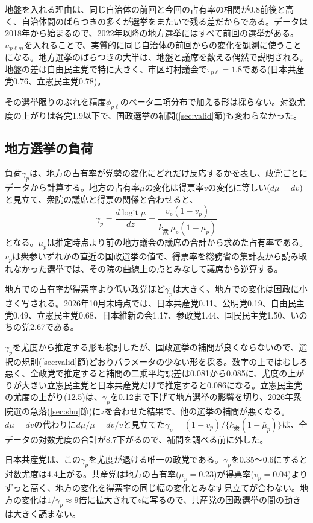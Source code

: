 \documentclass[a4paper,11pt]{ltjsarticle}
\begin{document}
地盤を入れる理由は、同じ自治体の前回と今回の占有率の相関が0.8前後と高く、自治体間のばらつきの多くが選挙をまたいで残る差だからである。データは2018年から始まるので、2022年以降の地方選挙にはすべて前回の選挙がある。$u_{p\ell m}$を入れることで、実質的に同じ自治体の前回からの変化を観測に使うことになる。地方選挙のばらつきの大半は、地盤と議席を数える偶然で説明される。地盤の差は自由民主党で特に大きく、市区町村議会で$\tau_{p\ell}=1.8$である(日本共産党0.76、立憲民主党0.78)。

その選挙限りのぶれを精度$\phi_{p\ell}$のベータ二項分布で加える形は採らない。対数尤度の上がりは各党1.9以下で、国政選挙の補間(\ref{sec:valid}節)も変わらなかった。

\subsection{地方選挙の負荷}

負荷$\gamma_p$は、地方の占有率が党勢の変化にどれだけ反応するかを表し、政党ごとにデータから計算する。地方の占有率$\mu$の変化は得票率$v$の変化に等しい($d\mu=dv$)と見立て、衆院の議席と得票の関係と合わせると、
\begin{equation}
  \gamma_p = \frac{d\operatorname{logit}\mu}{dz} = \frac{v_p(1-v_p)}{k_{\text{衆}}\,\bar\mu_p(1-\bar\mu_p)}
\end{equation}
となる。$\bar\mu_p$は推定時点より前の地方議会の議席の合計から求めた占有率である。$v_p$は衆参いずれかの直近の国政選挙の値で、得票率を総務省の集計表から読み取れなかった選挙では、その院の曲線上の点とみなして議席から逆算する。

地方での占有率が得票率より低い政党ほど$\gamma_p$は大きく、地方での変化は国政に小さく写される。2026年10月末時点では、日本共産党0.11、公明党0.19、自由民主党0.49、立憲民主党0.68、日本維新の会1.17、参政党1.44、国民民主党1.50、いのちの党2.67である。

$\gamma_p$を尤度から推定する形も検討したが、国政選挙の補間が良くならないので、選択の規則(\ref{sec:valid}節)どおりパラメータの少ない形を採る。数字の上ではむしろ悪く、全政党で推定すると補間の二乗平均誤差は0.081から0.085に、尤度の上がりが大きい立憲民主党と日本共産党だけで推定すると0.086になる。立憲民主党の尤度の上がり(12.5)は、$\gamma_p$を0.12まで下げて地方選挙の影響を切り、2026年衆院選の急落(\ref{sec:shu}節)に$z$を合わせた結果で、他の選挙の補間が悪くなる。$d\mu=dv$の代わりに$d\mu/\mu=dv/v$と見立てた$\gamma_p=(1-v_p)/\{k_{\text{衆}}(1-\bar\mu_p)\}$は、全データの対数尤度の合計が8.7下がるので、補間を調べる前に外した。

日本共産党は、この$\gamma_p$を尤度が退ける唯一の政党である。$\gamma_p$を0.35〜0.6にすると対数尤度は4.4上がる。共産党は地方の占有率($\bar\mu_p=0.23$)が得票率($v_p=0.04$)よりずっと高く、地方の変化を得票率の同じ幅の変化とみなす見立てが合わない。地方の変化は$1/\gamma_p\approx9$倍に拡大されて$z$に写るので、共産党の国政選挙の間の動きは大きく読まない。
\end{document}
